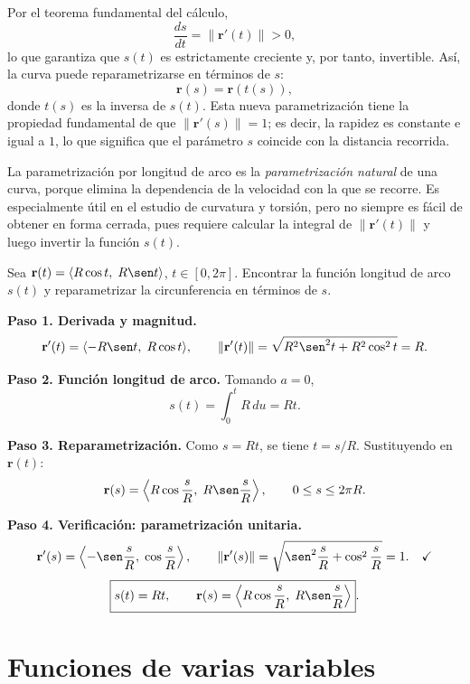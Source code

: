 Por el teorema fundamental del cálculo,
\[
\frac{ds}{dt} = \|\mathbf{r}'(t)\| > 0,
\]
lo que garantiza que $s(t)$ es estrictamente creciente y, por tanto,
invertible. Así, la curva puede reparametrizarse en términos de $s$:
\[
\mathbf{r}(s) = \mathbf{r}(t(s)),
\]
donde $t(s)$ es la inversa de $s(t)$. Esta nueva parametrización tiene
la propiedad fundamental de que $\|\mathbf{r}'(s)\| = 1$; es decir, la
rapidez es constante e igual a $1$, lo que significa que el parámetro
$s$ coincide con la distancia recorrida.

\begin{rem}
La parametrización por longitud de arco es la \emph{parametrización
natural} de una curva, porque elimina la dependencia de la velocidad
con la que se recorre. Es especialmente útil en el estudio de curvatura
y torsión, pero no siempre es fácil de obtener en forma cerrada, pues
requiere calcular la integral de $\|\mathbf{r}'(t)\|$ y luego invertir
la función $s(t)$.
\end{rem}

\begin{example}
Sea $\mathbf{r}(t) = \langle R\cos t,\; R\sen t \rangle$,
$t \in [0, 2\pi]$. Encontrar la función longitud de arco $s(t)$ y
reparametrizar la circunferencia en términos de $s$.
\begin{myproof}
\textbf{Paso 1. Derivada y magnitud.}
\[
\mathbf{r}'(t) = \langle -R\sen t,\; R\cos t \rangle,
\qquad
\|\mathbf{r}'(t)\| = \sqrt{R^2\sen^2 t + R^2\cos^2 t} = R.
\]

\textbf{Paso 2. Función longitud de arco.}
Tomando $a = 0$,
\[
s(t) = \int_0^t R\,du = Rt.
\]

\textbf{Paso 3. Reparametrización.}
Como $s = Rt$, se tiene $t = s/R$. Sustituyendo en $\mathbf{r}(t)$:
\[
\mathbf{r}(s) = \left\langle R\cos\frac{s}{R},\; R\sen\frac{s}{R} \right\rangle,
\qquad 0 \leq s \leq 2\pi R.
\]

\textbf{Paso 4. Verificación: parametrización unitaria.}
\[
\mathbf{r}'(s) = \left\langle -\sen\frac{s}{R},\; \cos\frac{s}{R} \right\rangle,
\qquad
\|\mathbf{r}'(s)\| = \sqrt{\sen^2\frac{s}{R} + \cos^2\frac{s}{R}} = 1. \quad\checkmark
\]
\[
\boxed{s(t) = Rt,\qquad \mathbf{r}(s) = \left\langle R\cos\frac{s}{R},\; R\sen\frac{s}{R} \right\rangle}.
\]
\end{myproof}
\end{example}

\section{Funciones de varias variables}
\label{sec:multivariable-functions}

